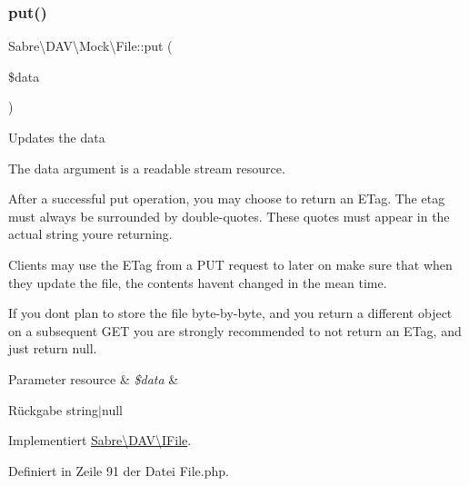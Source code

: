 \mbox{\label{class_sabre_1_1_d_a_v_1_1_mock_1_1_file_ab824c0a6b0467e31e5af15993713b8e9}} 
\subsubsection{\texorpdfstring{put()}{put()}}
{\footnotesize\ttfamily Sabre\textbackslash{}\+D\+A\+V\textbackslash{}\+Mock\textbackslash{}\+File\+::put (\begin{DoxyParamCaption}\item[{}]{\$data }\end{DoxyParamCaption})}

Updates the data

The data argument is a readable stream resource.

After a successful put operation, you may choose to return an E\+Tag. The etag must always be surrounded by double-\/quotes. These quotes must appear in the actual string you\textquotesingle{}re returning.

Clients may use the E\+Tag from a P\+UT request to later on make sure that when they update the file, the contents haven\textquotesingle{}t changed in the mean time.

If you don\textquotesingle{}t plan to store the file byte-\/by-\/byte, and you return a different object on a subsequent G\+ET you are strongly recommended to not return an E\+Tag, and just return null.


\begin{DoxyParams}[1]{Parameter}
resource & {\em \$data} & \\
\hline
\end{DoxyParams}
\begin{DoxyReturn}{Rückgabe}
string$\vert$null 
\end{DoxyReturn}


Implementiert \mbox{\hyperlink{interface_sabre_1_1_d_a_v_1_1_i_file_a0c30bc87b22d289f311c854f23993452}{Sabre\textbackslash{}\+D\+A\+V\textbackslash{}\+I\+File}}.



Definiert in Zeile 91 der Datei File.\+php.

\mbox{\label{class_sabre_1_1_d_a_v_1_1_mock_1_1_file_af7fc32874a561f416150bbcb4e9c856c}} 

